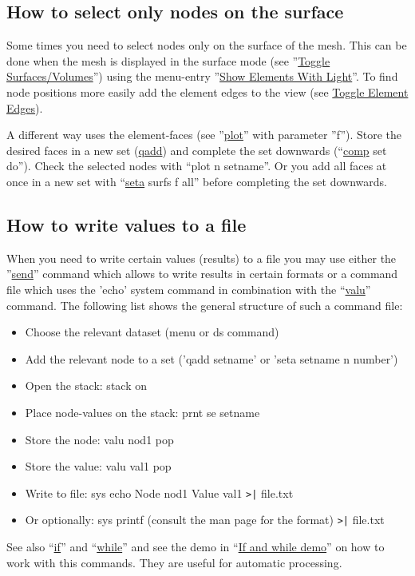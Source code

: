 \documentclass{article}
\providecommand{\htmlref}[2]{\hyperref[#2]{#1}}
\begin{document}
\begin{appendix}
\subsection{\label{How to select only nodes on the surface}How to select only nodes on the surface}
Some times you need to select nodes only on the surface of the mesh. This can be done when the mesh is displayed in the surface mode (see ''\htmlref{Toggle Surfaces/Volumes}{Toggle Surfaces/Volumes}'') using the menu-entry ''\htmlref{Show Elements With Light}{Show Elements With Light}''. To find node positions more easily add the element edges to the view (see \htmlref{Toggle Element Edges}{Toggle Element Edges}).

A different way uses the element-faces (see ''\htmlref{plot}{plot}'' with parameter ''f''). Store the desired faces in a new set (\htmlref{qadd}{qadd}) and complete the set downwards (``\htmlref{comp}{comp} set do''). Check the selected nodes with ``plot n setname''. Or you add all faces at once in a new set with ``\htmlref{seta}{seta} surfs f all'' before completing the set downwards.

\subsection{\label{How to write values to a file}How to write values to a file}
When you need to write certain values (results) to a file you may use either the ''\htmlref{send}{send}'' command which allows to write results in certain formats or a command file which uses the 'echo' system command in combination with the ``\htmlref{valu}{valu}'' command. The following list shows the general structure of such a command file:
\begin{itemize}
\item Choose the relevant dataset (menu or ds command)
\item Add the relevant node to a set ('qadd setname' or 'seta setname n number') 
\item Open the stack: stack on
\item Place node-values on the stack: prnt se setname
\item Store the node: valu nod1 pop 
\item Store the value: valu val1 pop 
\item Write to file: sys echo Node nod1 Value val1 \verb_>|_ file.txt
\item Or optionally: sys printf (consult the man page for the format) \verb_>|_ file.txt
\end{itemize}
See also ``\htmlref{if}{if}'' and ``\htmlref{while}{while}'' and see the demo in ``\htmlref{If and while demo}{If and while demo}'' on how to work with this commands. They are useful for automatic processing.


\end{appendix}
\end{document}
